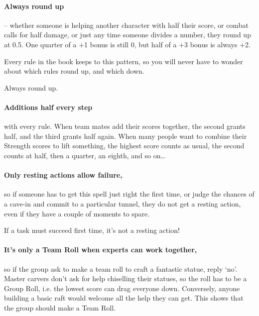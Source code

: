 \begin{multicols}{2}
\begin{scriptsize}
\begin{tabularx}{\linewidth}{clXX}
\end{tabularx}
\end{scriptsize}

\paragraph{Always round up} -- whether someone is helping another character with half their score, or combat calls for half damage, or just any time someone divides a number, they round up at 0.5.
One quarter of a +1 bonus is still 0, but half of a +3 bonus is always +2.

Every rule in the book keeps to this pattern, so you will never have to wonder about which rules round up, and which down.

Always round up.

\paragraph{Additions half every step} with every rule.
When team mates add their scores together, the second grants half, and the third grants half again.
When many people want to combine their Strength scores to lift something, the highest score counts as usual, the second counts at half, then a quarter, an eighth, and so on\ldots

\paragraph{Only resting actions allow failure,}
so if someone has to get this spell just right the first time, or judge the chances of a cave-in and commit to a particular tunnel, they do not get a resting action, even if they have a couple of moments to spare.

If a task must succeed first time, it's not a resting action!

\paragraph{It's only a Team Roll when experts can work together,}
so if the group ask to make a team roll to craft a fantastic statue, reply `no'.
Master carvers don't ask for help chiselling their statues, so the roll has to be a Group Roll, i.e. the lowest score can drag everyone down.
Conversely, anyone building a basic raft would welcome all the help they can get.
This shows that the group should make a Team Roll.


\end{multicols}
